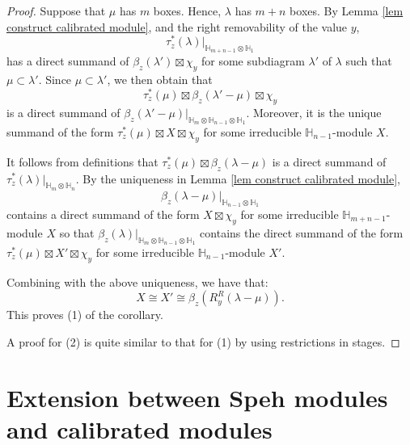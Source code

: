 \documentclass[11pt]{amsart}
\numberwithin{equation}{section}
\theoremstyle{definition}
\begin{document}
\begin{proof}
Suppose that $\mu$ has $m$ boxes. Hence, $\lambda$ has $m+n$ boxes. By Lemma \ref{lem construct calibrated module}, and the right removability of the value \(y\),
\[  \tau^*_z(\lambda)|_{\mathbb H_{m+n-1} \otimes \mathbb H_1} 
\]
has a direct summand of $\beta_z(\lambda')\boxtimes \chi_y$ for some subdiagram \(\lambda'\) of \(\lambda\) such that \(\mu \subset \lambda'\). Since $\mu \subset \lambda'$, we then obtain that
\[  \tau^*_z(\mu) \boxtimes \beta_z(\lambda'-\mu) \boxtimes \chi_y
\]
is a direct summand of $\beta_z(\lambda'-\mu)|_{\mathbb H_m\otimes \mathbb H_{n-1}\otimes \mathbb H_1}$. Moreover, it is the unique summand of the form $\tau^*_z(\mu) \boxtimes X \boxtimes \chi_y$ for some irreducible $\mathbb H_{n-1}$-module \(X\). 


It follows from definitions that $\tau^*_{z}(\mu) \boxtimes \beta_z(\lambda-\mu)$ is a direct summand of $\tau^*_z(\lambda)|_{\mathbb H_{m}\otimes \mathbb H_n}$. By the uniqueness in Lemma \ref{lem construct calibrated module},  
\[  \beta_z(\lambda-\mu)|_{\mathbb H_{n-1}\otimes \mathbb H_1}
\]
contains a direct summand of the form $X \boxtimes \chi_y$ for some irreducible $\mathbb H_{m+n-1}$-module $X$ so that $\beta_z(\lambda)|_{\mathbb H_m \otimes \mathbb H_{n-1}\otimes \mathbb H_1}$ contains the direct summand of the form $\tau^*_z(\mu)\boxtimes X' \boxtimes \chi_y$ for some irreducible $\mathbb H_{n-1}$-module $X'$.

Combining with the above uniqueness, we have that:
\[  X \cong X' \cong \beta_z(R^R_y(\lambda-\mu)) .  
\]
This proves (1) of the corollary. 

A proof for (2) is quite similar to that for (1) by using restrictions in stages.
\end{proof}








\section{Extension between Speh modules and calibrated modules}\label{sec ext between speh and calibrated}






\end{document}
